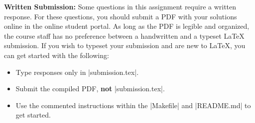 {\bf Written Submission:}
Some questions in this assignment require a written response.  For these questions, you should submit a PDF
with your solutions online in the online student portal. As long as the PDF is legible and organized, the course
staff has no preference between a handwritten and a typeset \LaTeX{} submission.
If you wish to typeset your submission and are new to \LaTeX{}, you can get started with the following:
\begin{itemize}
  \item Type responses only in |submission.tex|.
  \item Submit the compiled PDF, {\bf not} |submission.tex|.
  \item Use the commented instructions within the |Makefile| and |README.md| to
  get started.
\end{itemize}